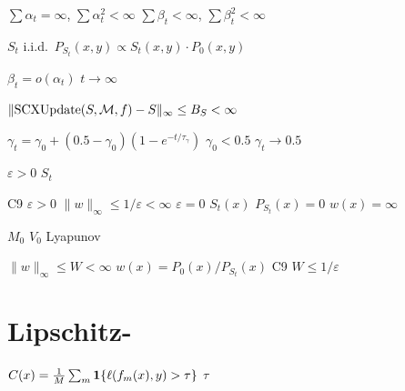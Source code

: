 \begin{assumption}[C4: ]\label{ass:c4}
 $\sum \alpha_t = \infty$, $\sum \alpha_t^2 < \infty$ $\sum \beta_t < \infty$, $\sum \beta_t^2 < \infty$
\end{assumption}

\begin{assumption}[C5:  i.i.d.\ ]\label{ass:c5}
 $S_t$  i.i.d.\ $P_{S_t}(x,y) \propto S_t(x,y) \cdot P_0(x,y)$
\end{assumption}

\begin{assumption}[C6: ]\label{ass:c6}
$\beta_t = o(\alpha_t)$  $t \to \infty$
\end{assumption}

\begin{assumption}[C7: ]\label{ass:c7}
$\|\text{SCXUpdate}(S, \mathcal{M}, f) - S\|_\infty \leq B_S < \infty$
\end{assumption}

\begin{assumption}[C8: ]\label{ass:c8}
$\gamma_t = \gamma_0 + (0.5 - \gamma_0)(1 - e^{-t/\tau_\gamma})$  $\gamma_0 < 0.5$ $\gamma_t \to 0.5$
\end{assumption}

\begin{assumption}[C9: ]\label{ass:c9}
 $\varepsilon > 0$  $S_t$ 
\end{assumption}

\textbf{}C9  $\varepsilon > 0$ $\|w\|_\infty \leq 1/\varepsilon < \infty$ $\varepsilon = 0$ $S_t(x)$  $P_{S_t}(x) = 0$  $w(x) = \infty$

\begin{assumption}[C10: Lyapunov ]\label{ass:c10}
 $M_0$  $V_0$ Lyapunov 
\end{assumption}

\begin{assumption}[C11: ]\label{ass:c11}
$\|w\|_\infty \leq W < \infty$  $w(x) = P_0(x)/P_{S_t}(x)$ C9 $W \leq 1/\varepsilon$
\end{assumption}

\section{Lipschitz-}

 $C(x) = \frac{1}{M}\sum_m \mathbf{1}\{\ell(f_m(x), y) > \tau\}$  $\tau$ 

